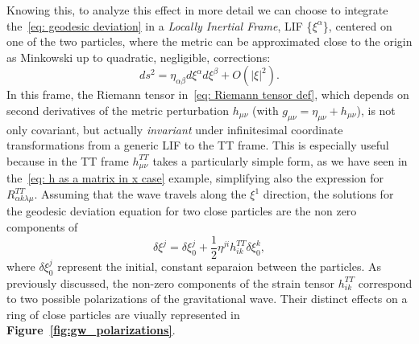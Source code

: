 Knowing this, to analyze this effect in more detail we can choose to integrate the~\eqref{eq: geodesic deviation} in a \textit{Locally Inertial Frame}, LIF \{$\xi^\alpha$\}, centered on one of the two particles, where the metric can be approximated close to the origin as Minkowski up to quadratic, negligible, corrections:
\[
    ds^2 = \eta_{\alpha\beta} d\xi^\alpha d\xi^\beta + O(|\xi|^2).
\]
In this frame, the Riemann tensor in~\eqref{eq: Riemann tensor def}, which depends on second derivatives of the metric perturbation $h_{\mu\nu}$ (with $g_{\mu\nu} = \eta_{\mu\nu} + h_{\mu\nu}$), is not only covariant, but actually \textit{invariant} under infinitesimal coordinate transformations from a generic LIF to the TT frame. 
This is especially useful because in the TT frame $h^{TT}_{\mu\nu}$ takes a particularly simple form, as we have seen in the~\eqref{eq: h as a matrix in x case} example, simplifying also the expression for $R^{TT}_{\alpha k \lambda \mu}$. 
Assuming that the wave travels along the $\xi^1$ direction, the solutions for the geodesic deviation equation for two close particles are the non zero components of 
\begin{equation}
    \delta\xi^j = \delta\xi_0^j + \frac{1}{2}\eta^{ji} h^{TT}_{ik} \delta\xi_0^k,
    \label{eq: solution of geodesic deviation}
\end{equation}
where $\delta\xi_0^j$ represent the initial, constant separaion between the particles. 
As previously discussed, the non-zero components of the strain tensor $h_{ik}^{TT}$ correspond to two possible polarizations of the gravitational wave. 
Their distinct effects on a ring of close particles are viually represented in \textbf{Figure~\ref{fig:gw_polarizations}}.
